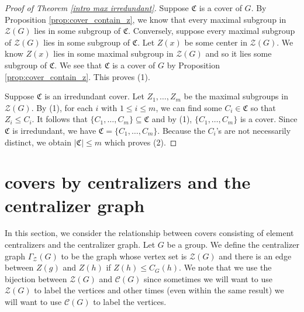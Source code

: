 \documentclass[12pt]{amsart}
\begin{document}
{\begin{proof}[Proof of Theorem \ref{intro max irredundant}]
Suppose $\mathfrak{C}$ is a cover of $G$.  By Proposition \ref{prop:cover_contain_z}, we know that every maximal subgroup in $\mathcal {Z} (G)$ lies in some subgroup of $\mathfrak {C}$.  Conversely, suppose every maximal subgroup of $\mathcal {Z} (G)$ lies in some subgroup of $\mathfrak {C}$.  Let $Z(x)$ be some center in $\mathcal{Z} (G)$.  We know $Z (x)$ lies in some maximal subgroup in $\mathcal {Z} (G)$ and so it lies some subgroup of $\mathfrak {C}$.  We see that $\mathfrak{C}$ is a cover of $G$ by Proposition \ref{prop:cover_contain_z}.  This proves (1).
	
Suppose $\mathfrak{C}$ is an irredundant cover.  Let $Z_1, \dots, Z_m$ be the maximal subgroups in $\mathcal{Z} (G)$.  By (1), for each $i$ with $1 \le i \le m$, we can find some $C_i \in \mathfrak C$ so that $Z_i \le C_i$.  It follows that $\{ C_1, \dots, C_m \} \subseteq \mathfrak{C}$ and by (1), $\{ C_1, \dots, C_m \}$ is a cover.  Since $\mathfrak{C}$ is irredundant, we have $\mathfrak{C} = \{ C_1, \dots, C_m \}$.  Because the $C_i$'s are not necessarily distinct, we obtain $|\mathfrak{C}| \le m$ which proves (2).
\end{proof}

\section{covers by centralizers and the centralizer graph}\label{secn:graph}

In this section, we consider the relationship between covers consisting of element centralizers and the centralizer graph.  Let $G$ be a group.  We define the centralizer graph $\Gamma_{\mathcal{Z}} (G)$ to be the graph whose vertex set is $\mathcal{Z} (G)$ and there is an edge between $Z(g)$ and $Z(h)$ if $Z(h) \le C_G (h)$.  We note that we use the bijection between $\mathcal {Z} (G)$ and $\mathcal {C} (G)$ since sometimes we will want to use $\mathcal {Z} (G)$ to label the vertices and other times (even within the same result) we will want to use $\mathcal {C} (G)$ to label the vertices.

}
\end{document}
